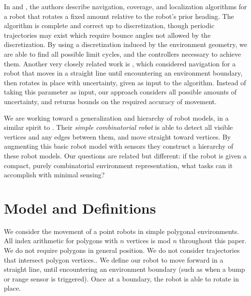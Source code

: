 \documentclass[]{styles/svproc}  %
\begin{document}
In \cite{alam2017minimalist} and \cite{alam2018space}, the authors describe
navigation, coverage, and localization algorithms for a robot that rotates a fixed amount 
relative to the robot's prior heading. The
algorithm is complete and correct up to discretization, though periodic
trajectories may exist which require bounce angles not allowed by the
discretization. By using a discretization induced by the environment geometry,
we are able to find all possible limit cycles, and the controllers necessary to
achieve them.
Another very closely related work is \cite{LewOKa13}, which considered
navigation for a robot that moves in a straight line until encountering an
environment boundary, then rotates in place with uncertainty, given as input to the
algorithm. Instead of taking this parameter as input, our approach
considers all possible amounts of uncertainty, and returns bounds on the required
accuracy of movement.

We are working toward a generalization and hierarchy of robot models, in a
similar spirit to \cite{brunner2008simple}. Their {\em simple
combinatorial robot} is able to detect all visible vertices and any edges
between them, and move straight toward vertices. By augmenting this basic robot model
with sensors they construct a hierarchy of these robot models. Our questions are related but 
different: if the robot is given a compact, purely combinatorial environment representation, 
what tasks can it accomplish with minimal sensing?



\section{Model and Definitions}

We consider the movement of a point robots in simple 
polygonal environments. All index arithmetic for polygons with $n$ vertices is mod $n$ 
throughout this paper. We do not require polygons in general position. We do
not consider trajectories that intersect polygon vertices.. We define our robot to move forward in a straight line, until
encountering an environment boundary (such as when a bump or range sensor is
triggered). Once at a boundary, the robot is able to rotate in place.
\end{document}
